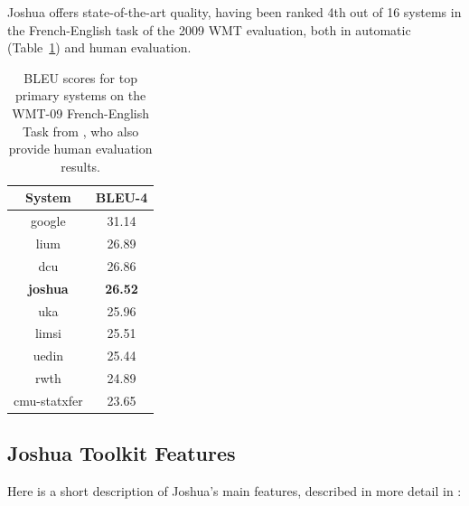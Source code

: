\documentclass[11pt]{article}
\begin{document}
Joshua offers state-of-the-art quality, having been
ranked 4th out of 16 systems in the French-English task of the 2009 WMT
evaluation, both in automatic (Table~\ref{results-wmt09}) and human
evaluation.

\begin{table}[t]
\begin{center}
\begin{tabular}{c c}\hline
  System & B{\small LEU}-4 \\ \hline
  google & 31.14 \\
  lium & 26.89 \\
  dcu & 26.86 \\
  {\bf joshua} & {\bf 26.52} \\
  uka & 25.96 \\
  limsi & 25.51 \\
  uedin & 25.44 \\
  rwth & 24.89 \\
  cmu-statxfer & 23.65 \\ \hline
\end{tabular}
\end{center}
\caption{B{\small LEU} scores for top primary systems on the WMT-09 French-English Task from ,
who also provide human evaluation results.}
\label{results-wmt09}
\end{table}

\subsection{Joshua Toolkit Features}

Here is a short description of Joshua's main features, described in more detail in :
\end{document}
